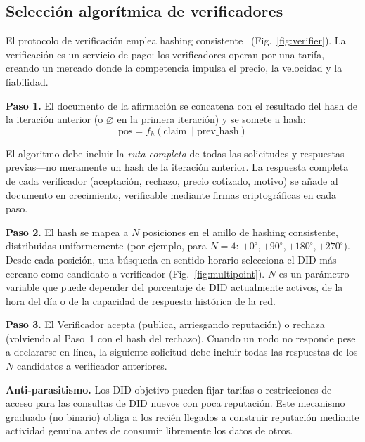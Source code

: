 \documentclass[11pt,a4paper,twocolumn]{article}
\begin{document}
\subsection{Selección algorítmica de verificadores}

El protocolo de verificación emplea hashing consistente~\cite{karger1997} (Fig.~\ref{fig:verifier}). La verificación es un servicio de pago: los verificadores operan por una tarifa, creando un mercado donde la competencia impulsa el precio, la velocidad y la fiabilidad.

\textbf{Paso 1.} El documento de la afirmación se concatena con el resultado del hash de la iteración anterior (o $\varnothing$ en la primera iteración) y se somete a hash:
\begin{equation}
\text{pos} = f_h(\text{claim} \| \text{prev\_hash})
\label{eq:hash}
\end{equation}

El algoritmo debe incluir la \emph{ruta completa} de todas las solicitudes y respuestas previas---no meramente un hash de la iteración anterior. La respuesta completa de cada verificador (aceptación, rechazo, precio cotizado, motivo) se añade al documento en crecimiento, verificable mediante firmas criptográficas en cada paso.

\textbf{Paso 2.} El hash se mapea a $N$ posiciones en el anillo de hashing consistente, distribuidas uniformemente (por ejemplo, para $N=4$: $+0^{\circ}, +90^{\circ}, +180^{\circ}, +270^{\circ}$). Desde cada posición, una búsqueda en sentido horario selecciona el DID más cercano como candidato a verificador (Fig.~\ref{fig:multipoint}). $N$ es un parámetro variable que puede depender del porcentaje de DID actualmente activos, de la hora del día o de la capacidad de respuesta histórica de la red.

\textbf{Paso 3.} El Verificador acepta (publica, arriesgando reputación) o rechaza (volviendo al Paso~1 con el hash del rechazo). Cuando un nodo no responde pese a declararse en línea, la siguiente solicitud debe incluir todas las respuestas de los $N$ candidatos a verificador anteriores.

\textbf{Anti-parasitismo.} Los DID objetivo pueden fijar tarifas o restricciones de acceso para las consultas de DID nuevos con poca reputación. Este mecanismo graduado (no binario) obliga a los recién llegados a construir reputación mediante actividad genuina antes de consumir libremente los datos de otros.
\end{document}
